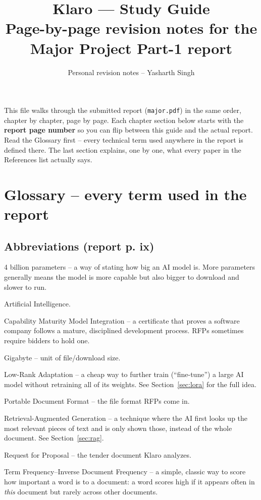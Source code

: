 \documentclass[11pt,a4paper]{article}
\title{\textbf{Klaro --- Study Guide}\\[4pt]\large Page-by-page revision notes for the Major Project Part-1 report}
\author{Personal revision notes -- Yasharth Singh}
\date{}
\begin{document}
\maketitle
\vspace{-1em}

\begin{keynums}[title={How to use this guide}]
This file walks through the submitted report (\texttt{major.pdf}) in the same order, chapter by
chapter, page by page. Each chapter section below starts with the \textbf{report page number} so you
can flip between this guide and the actual report. Read the Glossary first -- every technical term
used anywhere in the report is defined there. The last section explains, one by one, what every
paper in the References list actually says.
\end{keynums}

\tableofcontents
\newpage

\section{Glossary -- every term used in the report}

\subsection{Abbreviations (report p. ix)}
\begin{description}[style=nextline,leftmargin=1.6cm]
  \item[4B] 4 billion parameters -- a way of stating how big an AI model is. More parameters
    generally means the model is more capable but also bigger to download and slower to run.
  \item[AI] Artificial Intelligence.
  \item[CMMI] Capability Maturity Model Integration -- a certificate that proves a software company
    follows a mature, disciplined development process. RFPs sometimes require bidders to hold one.
  \item[GB] Gigabyte -- unit of file/download size.
  \item[LoRA] Low-Rank Adaptation -- a cheap way to further train (``fine-tune'') a large AI model
    without retraining all of its weights. See Section~\ref{sec:lora} for the full idea.
  \item[PDF] Portable Document Format -- the file format RFPs come in.
  \item[RAG] Retrieval-Augmented Generation -- a technique where the AI first looks up the most
    relevant pieces of text and is only shown those, instead of the whole document. See
    Section~\ref{sec:rag}.
  \item[RFP] Request for Proposal -- the tender document Klaro analyzes.
  \item[TF-IDF] Term Frequency--Inverse Document Frequency -- a simple, classic way to score how
    important a word is to a document: a word scores high if it appears often in \emph{this}
    document but rarely across other documents.
\end{description}
\end{document}

